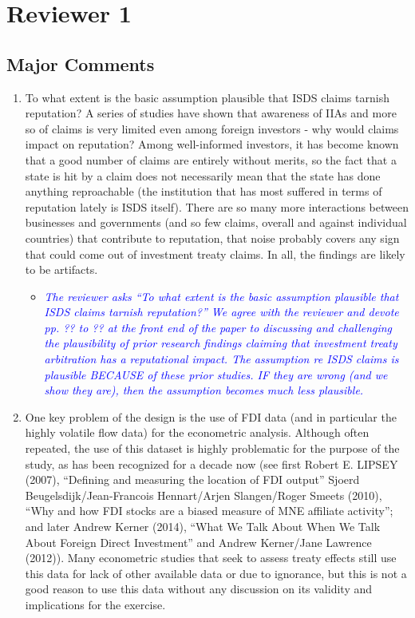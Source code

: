 \section{Reviewer 1}

\subsection{Major Comments}

\begin{enumerate}
	\item To what extent is the basic assumption plausible that ISDS claims tarnish reputation? A series of studies have shown that awareness of IIAs and more so of claims is very limited even among foreign investors - why would claims impact on reputation? Among well-informed investors, it has become known that a good number of claims are entirely without merits, so the fact that a state is hit by a claim does not necessarily mean that the state has done anything reproachable (the institution that has most suffered in terms of reputation lately is ISDS itself). There are so many more interactions between businesses and governments (and so few claims, overall and against individual countries) that contribute to reputation, that noise probably covers any sign that could come out of investment treaty claims. In all, the findings are likely to be artifacts. 
	\begin{itemize}
		\item \textcolor{blue}{ \emph{
		The reviewer asks ``To what extent is the basic assumption plausible that ISDS claims tarnish reputation?'' We agree with the reviewer and devote pp. ?? to ?? at the front end of the paper to discussing and challenging the plausibility of prior research findings claiming that investment treaty arbitration has a reputational impact. The assumption re ISDS claims is plausible BECAUSE of these prior studies. IF they are wrong (and we show they are), then the assumption becomes much less plausible.
		}}
	\end{itemize}
	\item One key problem of the design is the use of FDI data (and in particular the highly volatile flow data) for the econometric analysis. Although often repeated, the use of this dataset is highly problematic for the purpose of the study, as has been recognized for a decade now (see first Robert E. LIPSEY (2007), ``Defining and measuring the location of FDI output'' Sjoerd Beugelsdijk/Jean-Francois Hennart/Arjen Slangen/Roger Smeets (2010), ``Why and how FDI stocks are a biased measure of MNE affiliate activity''; and later Andrew Kerner (2014), ``What We Talk About When We Talk About Foreign Direct Investment'' and Andrew Kerner/Jane Lawrence (2012)). Many econometric studies that seek to assess treaty effects still use this data for lack of other available data or due to ignorance, but this is not a good reason to use this data without any discussion on its validity and implications for the exercise. 

\end{enumerate}
